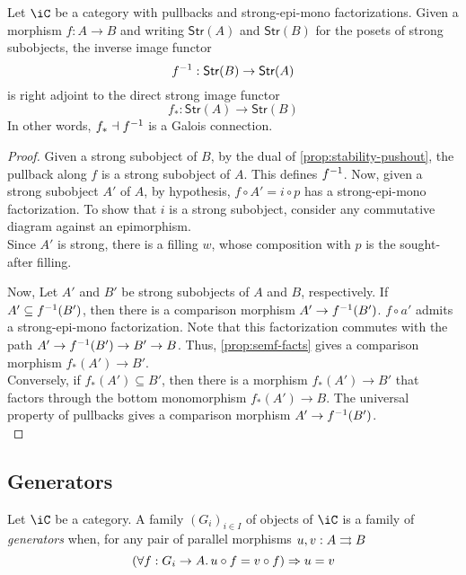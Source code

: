 \documentclass{amsart}
\begin{document}
\begin{prop}
  Let $\iC$ be a category with pullbacks and strong-epi-mono factorizations.
  Given a morphism $f : A \to B$ and writing $\mathsf{Str}(A)$ and $\mathsf{Str}(B)$ for the posets of strong subobjects, the inverse image functor
  \[
    f^{-1} : \mathsf{Str}(B) \to \mathsf{Str}(A)
  \]
  is right adjoint to the direct strong image functor
  \[
    f_{*} : \mathsf{Str}(A) \to \mathsf{Str}(B)
  \]
  In other words, $f_{*} \dashv f^{-1}$ is a Galois connection.
\end{prop}
\begin{proof}
  Given a strong subobject of $B$, by the dual of \cref{prop:stability-pushout}, the pullback along $f$ is a strong subobject of $A$.
  This defines $f^{-1}$.
  Now, given a strong subobject $A'$ of $A$, by hypothesis, $f \circ A' = i \circ p$ has a strong-epi-mono factorization.
  To show that $i$ is a strong subobject, consider any commutative diagram against an epimorphism.
  \[\]
  Since $A'$ is strong, there is a filling $w$, whose composition with $p$ is the sought-after filling.

  Now, Let $A'$ and $B'$ be strong subobjects of $A$ and $B$, respectively.
  If $A' \subseteq f^{-1}(B')$, then there is a comparison morphism $A' \to f^{-1}(B')$.
  $f \circ a'$ admits a strong-epi-mono factorization.
  Note that this factorization commutes with the path $A' \to f^{-1}(B') \to B' \to B$.
  Thus, \cref{prop:semf-facts} gives a comparison morphism $f_{*}(A') \to B'$.
  \[\]
  Conversely, if $f_{*}(A') \subseteq B'$, then there is a morphism $f_{*}(A') \to B'$ that factors through the bottom monomorphism $f_{*}(A') \to B$.
  The universal property of pullbacks gives a comparison morphism $A' \to f^{-1}(B')$.
  \[\]
\end{proof}

\subsection{Generators}
\label{sec:generators}

\begin{defn}
  Let $\iC$ be a category.
  A family $(G_{i})_{i \in I}$ of objects of $\iC$ is a family of \emph{generators} when, for any pair of parallel morphisms $u, v : A \rightrightarrows B$
  \[
    (\forall f : G_{i} \to A.\,u \circ f = v \circ f) \Rightarrow u = v
  \]
\end{defn}
\end{document}
